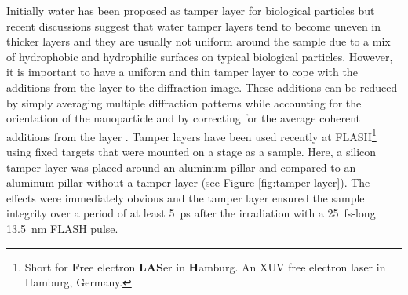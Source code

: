 %
Initially water has been proposed as tamper layer for biological particles \citep{Hau-Riege-2007-PRL} but recent discussions \citep{Aquila-2015-StrucDyn} suggest that water tamper layers tend to become uneven in thicker layers and they are usually not uniform around the sample due to a mix of hydrophobic and hydrophilic surfaces on typical biological particles. However, it is important to have a uniform and thin tamper layer to cope with the additions from the layer to the diffraction image. These additions can be reduced by simply averaging multiple diffraction patterns while accounting for the orientation of the nanoparticle and by correcting for the average coherent additions from the layer \citep{Hau-Riege-2007-PRL,Maia-2009-PRE}. Tamper layers have been used recently \citep{Hau-Riege-2010-PRL} at FLASH\footnote{Short for \textbf{F}ree electron \textbf{LAS}er in \textbf{H}amburg. An XUV free electron laser in Hamburg, Germany.} using fixed targets that were mounted on a stage as a sample. Here, a silicon tamper layer was placed around an aluminum pillar and compared to an aluminum pillar without a tamper layer (see Figure \ref{fig:tamper-layer}). The effects were immediately obvious and the tamper layer ensured the sample integrity over a period of at least \SI{5}{\pico\second} after the irradiation with a \SI{25}{\femto\second}-long \SI{13.5}{\nano\meter} FLASH pulse.\\[1\baselineskip]
%
